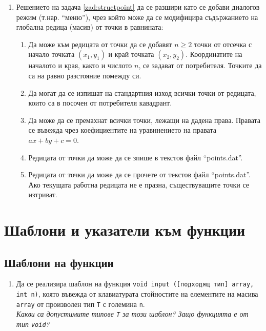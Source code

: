 {\begin{enumerate}[resume]
\item Решението на задача \ref{zad:structpoint} да се разшири като се добави диалогов режим (т.нар. ``меню''), чрез който може да се модифицира съдържанието на глобална редица (масив) от точки в равнината:
\begin{enumerate}[label=\alph*)]
  \item Да може към редицата от точки да се добавят $n \geq 2$ точки от отсечка с начало точката $(x_1,y_1)$ и край точката $(x_2,y_2)$. Координатите на началото и края, както и числото $n$, се задават от потребителя. Точките да са на равно разстояние помежду си.
  \item Да могат да се изпишат на стандартния изход всички точки от редицата, които са в посочен от потребителя кавадрант.
  \item Да може да се премахнат всички точки, лежащи на дадена права. Правата се въвежда чрез коефициентите на уравннението на правата $ax + by + c=0$.
  \item Редицата от точки да може да се зпише в текстов файл ``points.dat''.
  \item Редицата от точки да може да се прочете от текстов файл ``points.dat''. Ако текущата работна редицата не е празна, съществуващите точки се изтриват.

\end{enumerate}
\end{enumerate}


\pagebreak


\clearpage\section {Шаблони и указатели към функции}

\subsection{Шаблони на функции}

\begin{enumerate}

	\item Да се реализира шаблон на функция \texttt{void input ([подходящ тип] array, int n)}, която въвежда от клавиатурата стойностите на елементите на масива \texttt{array} от произволен тип \texttt{T} с големина \texttt{n}. \\

	\textit{Какви са допустимите типове \texttt{T} за този шаблон? Защо функцията е от тип \texttt{void}?}\\


\end{enumerate}}
